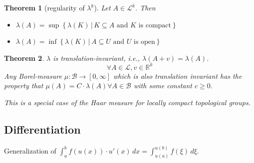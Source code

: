 \documentclass{article}
\newtheorem{theorem}{Theorem}  \numberwithin{theorem}{section}
\newcommand{\setdef}[2]{\left\{\left.#1\,\right|\,#2\right\}}
\begin{document}
\begin{theorem}[regularity of $\lambda^k$]
  Let $A \in \mathcal L^k$. Then
  \begin{itemize}
    \item $\lambda(A) = \sup\setdef{\lambda(K)}{K \subseteq A \text{ and } K \text{ is compact}}$
    \item $\lambda(A) = \inf\setdef{\lambda(K)}{A \subseteq U \text{ and } U \text{ is open}}$
  \end{itemize}
\end{theorem}

\begin{theorem}
  $\lambda$ is translation-invariant, i.e., $\lambda(A + v) = \lambda(A)$.
  \[ \forall A \in \mathcal L, v \in \mathbb R^k \]
  Any Borel-measure $\mu: \mathcal B \to [0, \infty]$ which is also translation invariant
  has the property that $\mu(A) = C \cdot \lambda(A) \forall A \in \mathcal B$ with some constant $c \geq 0$.

  This is a special case of the Haar measure for locally compact topological groups.
\end{theorem}

\subsection{Differentiation}

Generalization of $\int_a^b f(u(x)) \cdot u'(x) \, dx = \int_{u(a)}^{u(b)} f(\xi) \, d\xi$.
\end{document}
